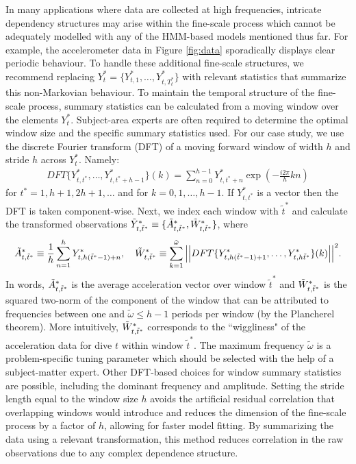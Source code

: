 In many applications where data are collected at high frequencies, intricate dependency structures may arise within the fine-scale process which cannot be adequately modelled with any of the HMM-based models mentioned thus far. For example, the accelerometer data in Figure \ref{fig:data} sporadically displays clear periodic behaviour. To handle these additional fine-scale structures, we recommend replacing $Y_t^* = \{Y^*_{t,1},\ldots,Y^*_{t,T^*_t}\}$ with relevant statistics that summarize this non-Markovian behaviour. To maintain the temporal structure of the fine-scale process, summary statistics can be calculated from a moving window over the elements $Y_t^*$. Subject-area experts are often required to determine the optimal window size and the specific summary statistics used. For our case study, we use the discrete Fourier transform (DFT) of a moving forward window of width $h$ and stride $h$ across $Y^*_t$. Namely:
%
\begin{align*}
    DFT\{Y^*_{t,t^*},\ldots, Y^*_{t,t^*+h-1}\}(k) = \sum_{n=0}^{h-1} Y^*_{t,t^*+n}\exp\left(-\frac{i 2\pi}{h} kn \right)
\end{align*}
%
for $t^* = 1,h+1,2h+1,\ldots$ and for $k = 0, 1, \ldots, h-1$. If $Y^*_{t,t^*}$ is a vector then the DFT is taken component-wise. Next, we index each window with $\tilde{t}^*$ and calculate the transformed observations $\tilde{Y}^*_{t,\tilde{t}^*} \equiv \{\tilde{A}^*_{t,\tilde{t}^*},\tilde{W}^*_{t,\tilde{t}^*}\}$, where
%
\begin{equation}
    \label{eqn:z}
    \Zone_{t,\tilde{t}^*} \equiv \frac{1}{h}\sum_{n=1}^{h}Y^*_{t,h(\tilde{t}^*-1)+n}, \quad \Ztwo_{t,\tilde{t}^*} \equiv \sum_{k=1}^{\tilde{\omega}}\Big|\Big|DFT\{Y^*_{t,h(\tilde{t}^*-1)+1},\ldots, Y^*_{t,h\tilde{t}^*}\}(k)\Big|\Big|^2.
\end{equation}
%
In words, $\tilde{A}^*_{t,\tilde{t}^*}$ is the average acceleration vector over window $\tilde{t}^*$ and $\tilde{W}^*_{t,\tilde{t}^*}$ is the squared two-norm of the component of the window that can be attributed to frequencies between one and $\tilde{\omega} \leq h-1$ periods per window (by the Plancherel theorem). More intuitively, $\tilde{W}^*_{t,\tilde{t}^*}$ corresponds to the ``wiggliness" of the acceleration data for dive $t$ within window $\tilde{t}^*$. The maximum frequency $\tilde{\omega}$ is a problem-specific tuning parameter which should be selected with the help of a subject-matter expert. Other DFT-based choices for window summary statistics are possible, including the dominant frequency and amplitude. Setting the stride length equal to the window size $h$ avoids the artificial residual correlation that overlapping windows would introduce and reduces the dimension of the fine-scale process by a factor of $h$, allowing for faster model fitting. By summarizing the data using a relevant transformation, this method reduces correlation in the raw observations due to any complex dependence structure.  

